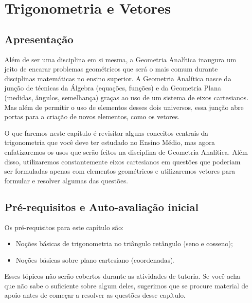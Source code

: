 \documentclass[main.tex]{subfiles}
\begin{document}
\paraAmbos

\chapter{Trigonometria e Vetores}

\paraAlunos

\section{Apresentação}

Além de ser uma disciplina em si mesma, a Geometria Analítica inaugura um jeito de encarar problemas geométricos que será o mais comum durante disciplinas matemáticas no ensino superior. A Geometria Analítica nasce da junção de técnicas da Álgebra (equações, funções) e da Geometria Plana (medidas, ângulos, semelhança) graças ao uso de um sistema de eixos cartesianos. Mas além de permitir o uso de elementos desses dois universos, essa junção abre portas para a criação de novos elementos, como os vetores.

O que faremos neste capítulo é revisitar alguns conceitos centrais da trigonometria que você deve ter estudado no Ensino Médio, mas agora enfatizaremos os usos que serão feitos na disciplina de Geometria Analítica. Além disso, utilizaremos constantemente eixos cartesianos em questões que poderiam ser formuladas apenas com elementos geométricos e utilizaremos vetores para formular e resolver algumas das questões.

\section{Pré-requisitos e Auto-avaliação inicial}

Os pré-requisitos para este capítulo são:
\begin{itemize}
 \item Noções básicas de trigonometria no triângulo retângulo (seno e cosseno);
 \item Noções básicas sobre plano cartesiano (coordenadas).
\end{itemize}

Esses tópicos não serão cobertos durante as atividades de tutoria. Se você acha que não sabe o suficiente sobre algum deles, sugerimos que se procure material de apoio antes de começar a resolver as questões desse capítulo.
\end{document}

